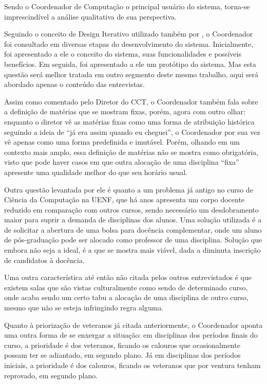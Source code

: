 Sendo o Coordenador de Computação o principal usuário do sistema, torna-se imprescindível a análise qualitativa de sua perspectiva.

Seguindo o conceito de Design Iterativo utilizado também por , o Coordenador foi consultado em diversas etapas do desenvolvimento do sistema. Inicialmente, foi apresentado a ele o conceito do sistema, suas funcionalidades e possíveis benefícios. Em seguida, foi apresentado a ele um protótipo do sistema. Mas esta questão será melhor tratada em outro segmento deste mesmo trabalho, aqui será abordado apenas o conteúdo das entrevistas.

Assim como comentado pelo Diretor do CCT, o Coordenador também fala sobre a definição de matérias que se mostram fixas, porém, agora com outro olhar: enquanto o diretor vê as matérias fixas como uma forma de atribuição histórica seguindo a ideia de ``já era assim quando eu cheguei'', o Coordenador por sua vez vê apenas como uma forma predefinida e imutável. Porém, olhando em um contexto mais amplo, essa definição de matérias não se mostra como obrigatória, visto que pode haver casos em que outra alocação de uma disciplina ``fixa'' apresente uma qualidade melhor do que seu horário usual.

Outra questão levantada por ele é quanto a um problema já antigo no curso de Ciência da Computação na UENF, que há anos apresenta um corpo docente reduzido em comparação com outros cursos, sendo necessário um desdobramento maior para suprir a demanda de disciplinas dos alunos. Uma solução utilizada é a de solicitar a abertura de uma bolsa para docência complementar, onde um aluno de pós-graduação pode ser alocado como professor de uma disciplina. Solução que embora não seja a ideal, é a que se mostra mais viável, dada a diminuta inscrição de candidatos à docência.

Uma outra característica até então não citada pelos outros entrevistados é que existem salas que são vistas culturalmente como sendo de determinado curso, onde acaba sendo um certo tabu a alocação de uma disciplina de outro curso, mesmo que não se esteja infringindo regra alguma.

Quanto à priorização de veteranos já citada anteriormente, o Coordenador aponta uma outra forma de se enxergar a situação: em disciplinas dos períodos finais do curso, a prioridade é dos veteranos, ficando os calouros que ocasionalmente possam ter se adiantado, em segundo plano. Já em disciplinas dos períodos iniciais, a prioridade é dos calouros, ficando os veteranos que por ventura tenham reprovado, em segundo plano.

